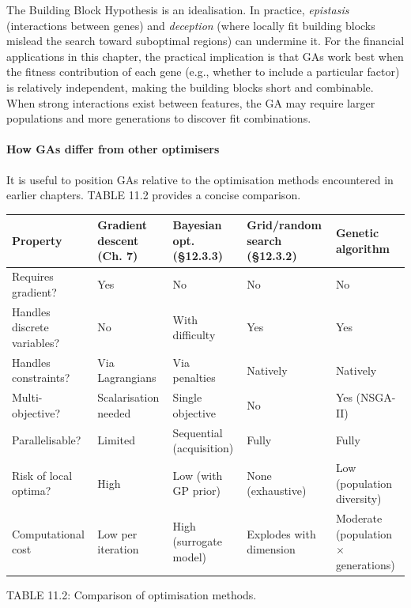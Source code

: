 The Building Block Hypothesis is an idealisation. In practice, \textit{epistasis} (interactions between genes) and \textit{deception} (where locally fit building blocks mislead the search toward suboptimal regions) can undermine it. For the financial applications in this chapter, the practical implication is that GAs work best when the fitness contribution of each gene (e.g., whether to include a particular factor) is relatively independent, making the building blocks short and combinable. When strong interactions exist between features, the GA may require larger populations and more generations to discover fit combinations.

\paragraph{How GAs differ from other optimisers}

It is useful to position GAs relative to the optimisation methods encountered in earlier chapters. TABLE 11.2 provides a concise comparison.

\bigskip\noindent
\begin{tabular}{p{}p{}p{}p{}p{}}
\toprule
Property & Gradient descent (Ch. 7) & Bayesian opt. (§12.3.3) & Grid/random search (§12.3.2) & Genetic algorithm \\
\hline
Requires gradient? & Yes & No & No & No \\
Handles discrete variables? & No & With difficulty & Yes & Yes \\
Handles constraints? & Via Lagrangians & Via penalties & Natively & Natively \\
Multi-objective? & Scalarisation needed & Single objective & No & Yes (NSGA-II) \\
Parallelisable? & Limited & Sequential (acquisition) & Fully & Fully \\
Risk of local optima? & High & Low (with GP prior) & None (exhaustive) & Low (population diversity) \\
Computational cost & Low per iteration & High (surrogate model) & Explodes with dimension & Moderate (population $\times$ generations) \\
\bottomrule
\end{tabular}

\bigskip

TABLE 11.2: Comparison of optimisation methods.

